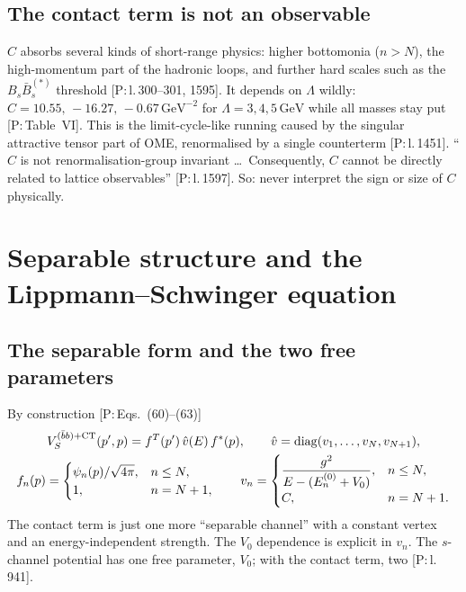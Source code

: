 \documentclass[11pt,a4paper]{article}
\newcommand{\tagP}[1]{\textcolor{blue!65!black}{\textsf{\small[P:\,#1]}}}
\newcommand{\GeV}{\,\mathrm{GeV}}
\begin{document}
\subsection{The contact term is not an observable}

$C$ absorbs several kinds of short-range physics: higher bottomonia ($n>N$), the high-momentum part of the hadronic loops, and further hard scales such as the $B_s\bar B_s^{(*)}$ threshold \tagP{l.\,300--301, 1595}. It depends on $\Lambda$ wildly: $C=10.55,\,-16.27,\,-0.67\GeV^{-2}$ for $\Lambda=3,4,5\GeV$ while all masses stay put \tagP{Table~VI}. This is the limit-cycle-like running caused by the singular attractive tensor part of OME, renormalised by a single counterterm \tagP{l.\,1451}. ``$C$ is not renormalisation-group invariant \dots\ Consequently, $C$ cannot be directly related to lattice observables'' \tagP{l.\,1597}. So: never interpret the sign or size of $C$ physically.

\section{Separable structure and the Lippmann--Schwinger equation}
\label{sec:lse}

\subsection{The separable form and the two free parameters}

By construction \tagP{Eqs.~(60)--(63)}
\begin{gather}
V_S^{(\bar bb)+{\rm CT}}(p',p)=f^T(p')\,\hat v(E)\,f^*(p),\qquad \hat v={\rm diag}(v_1,\dots,v_N,v_{N+1}),\\
f_n(p)=\begin{cases}\psi_n(p)/\sqrt{4\pi},&n\le N,\\ 1,&n=N+1,\end{cases}\qquad
v_n=\begin{cases}\dfrac{g^2}{E-(E_n^{(0)}+V_0)},&n\le N,\\[2mm] C,&n=N+1.\end{cases}
\end{gather}
The contact term is just one more ``separable channel'' with a constant vertex and an energy-independent strength. The $V_0$ dependence is explicit in $v_n$. The $s$-channel potential has one free parameter, $V_0$; with the contact term, two \tagP{l.\,941}.
\end{document}
